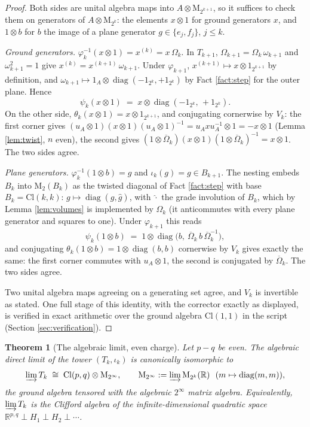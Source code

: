 \documentclass[11pt]{article}
\newtheorem{theorem}{Theorem}[section]
\theoremstyle{definition}
\newcommand{\Cl}{\mathrm{Cl}}
\newcommand{\R}{\mathbb{R}}
\newcommand{\Mat}{\mathrm{M}}
\begin{document}
\begin{proof}
Both sides are unital algebra maps into $A \otimes \Mat_{2^{k+1}}$, so it suffices to check them on generators of $A \otimes \Mat_{2^k}$: the elements $x \otimes 1$ for ground generators $x$, and $1 \otimes b$ for $b$ the image of a plane generator $g \in \{e_j, f_j\}$, $j \leq k$.

\emph{Ground generators.} $\varphi_k^{-1}(x \otimes 1) = x^{(k)} = x\,\Omega_k$. In $T_{k+1}$, $\Omega_{k+1} = \Omega_k\, \omega_{k+1}$ and $\omega_{k+1}^2 = 1$ give $x^{(k)} = x^{(k+1)}\, \omega_{k+1}$. Under $\varphi_{k+1}$, $x^{(k+1)} \mapsto x \otimes 1_{2^{k+1}}$ by definition, and $\omega_{k+1} \mapsto 1_A \otimes \operatorname{diag}(-1_{2^k}, +1_{2^k})$ by Fact \ref{fact:step} for the outer plane. Hence
\[
\psi_k(x \otimes 1) \;=\; x \otimes \operatorname{diag}(-1_{2^k},\, +1_{2^k}).
\]
On the other side, $\theta_k(x \otimes 1) = x \otimes 1_{2^{k+1}}$, and conjugating cornerwise by $V_k$: the first corner gives $(u_A \otimes 1)(x \otimes 1)(u_A \otimes 1)^{-1} = u_A x u_A^{-1} \otimes 1 = -x \otimes 1$ (Lemma \ref{lem:twist}, $n$ even), the second gives $(1 \otimes \overline\Omega_k)(x \otimes 1)(1 \otimes \overline\Omega_k)^{-1} = x \otimes 1$. The two sides agree.

\emph{Plane generators.} $\varphi_k^{-1}(1 \otimes b) = g$ and $\iota_k(g) = g \in B_{k+1}$. The nesting embeds $B_k$ into $\Mat_2(B_k)$ as the twisted diagonal of Fact \ref{fact:step} with base $B_k = \Cl(k,k)$: $g \mapsto \operatorname{diag}(g, \hat g)$, with $\hat{\cdot}$ the grade involution of $B_k$, which by Lemma \ref{lem:volumes} is implemented by $\Omega_k$ (it anticommutes with every plane generator and squares to one). Under $\varphi_{k+1}$ this reads
\[
\psi_k(1 \otimes b) \;=\; 1 \otimes \operatorname{diag}\bigl(b,\ \overline\Omega_k\, b\, \overline\Omega_k^{-1}\bigr),
\]
and conjugating $\theta_k(1 \otimes b) = 1 \otimes \operatorname{diag}(b, b)$ cornerwise by $V_k$ gives exactly the same: the first corner commutes with $u_A \otimes 1$, the second is conjugated by $\overline\Omega_k$. The two sides agree.

Two unital algebra maps agreeing on a generating set agree, and $V_k$ is invertible as stated. One full stage of this identity, with the corrector exactly as displayed, is verified in exact arithmetic over the ground algebra $\Cl(1,1)$ in the script (Section \ref{sec:verification}).
\end{proof}

\begin{theorem}[The algebraic limit, even charge]\label{thm:alglimit}
Let $p - q$ be even. The algebraic direct limit of the tower $(T_k, \iota_k)$ is canonically isomorphic to
\[
\varinjlim T_k \;\cong\; \Cl(p,q) \otimes \Mat_{2^\infty}, \qquad \Mat_{2^\infty} := \varinjlim \Mat_{2^k}(\R) \ \ (m \mapsto \operatorname{diag}(m,m)),
\]
the ground algebra tensored with the algebraic $2^\infty$ matrix algebra. Equivalently, $\varinjlim T_k$ is the Clifford algebra of the infinite-dimensional quadratic space $\R^{p,q} \perp H_1 \perp H_2 \perp \cdots$.
\end{theorem}
\end{document}
